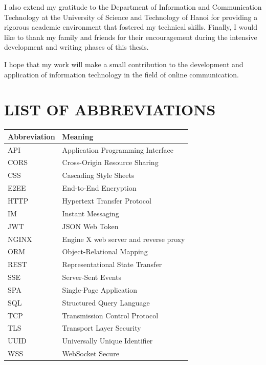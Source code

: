 \documentclass[12pt, a4paper]{article}
\begin{document}
I also extend my gratitude to the Department of Information and Communication
Technology at the University of Science and Technology of Hanoi for providing a
rigorous academic environment that fostered my technical skills. Finally, I would
like to thank my family and friends for their encouragement during the intensive
development and writing phases of this thesis.

I hope that my work will make a small contribution to the development and
application of information technology in the field of online communication.

\newpage


\section*{LIST OF ABBREVIATIONS}

\begin{center}
\begin{tabular}{p{3cm} p{10cm}}
\toprule
\textbf{Abbreviation} & \textbf{Meaning} \\
\midrule
API & Application Programming Interface \\
CORS & Cross-Origin Resource Sharing \\
CSS & Cascading Style Sheets \\
E2EE & End-to-End Encryption \\
HTTP & Hypertext Transfer Protocol \\
IM & Instant Messaging \\
JWT & JSON Web Token \\
NGINX & Engine X web server and reverse proxy \\
ORM & Object-Relational Mapping \\
REST & Representational State Transfer \\
SSE & Server-Sent Events \\
SPA & Single-Page Application \\
SQL & Structured Query Language \\
TCP & Transmission Control Protocol \\
TLS & Transport Layer Security \\
UUID & Universally Unique Identifier \\
WSS & WebSocket Secure \\
\bottomrule
\end{tabular}
\end{center}
\end{document}
